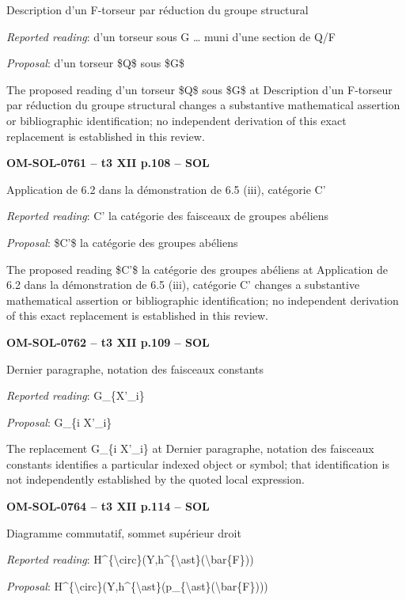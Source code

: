 Description d'un F-torseur par réduction du groupe structural\par
\emph{Reported reading}: d'un torseur sous G … muni d'une section de Q/F\par
\emph{Proposal}: d'un torseur \$Q\$ sous \$G\$\par
The proposed reading d'un torseur \$Q\$ sous \$G\$ at Description d'un F-torseur par réduction du groupe structural changes a substantive mathematical assertion or bibliographic identification; no independent derivation of this exact replacement is established in this review.\par
\par\noindent\textbf{OM-SOL-0761 -- t3 XII p.108 -- SOL}\par
Application de 6.2 dans la démonstration de 6.5 (iii), catégorie C'\par
\emph{Reported reading}: C' la catégorie des faisceaux de groupes abéliens\par
\emph{Proposal}: \$C'\$ la catégorie des groupes abéliens\par
The proposed reading \$C'\$ la catégorie des groupes abéliens at Application de 6.2 dans la démonstration de 6.5 (iii), catégorie C' changes a substantive mathematical assertion or bibliographic identification; no independent derivation of this exact replacement is established in this review.\par
\par\noindent\textbf{OM-SOL-0762 -- t3 XII p.109 -- SOL}\par
Dernier paragraphe, notation des faisceaux constants\par
\emph{Reported reading}: G\_\{X'\_i\}\par
\emph{Proposal}: G\_\{i X'\_i\}\par
The replacement G\_\{i X'\_i\} at Dernier paragraphe, notation des faisceaux constants identifies a particular indexed object or symbol; that identification is not independently established by the quoted local expression.\par
\par\noindent\textbf{OM-SOL-0764 -- t3 XII p.114 -- SOL}\par
Diagramme commutatif, sommet supérieur droit\par
\emph{Reported reading}: H\textasciicircum{}\{\textbackslash{}circ\}(Y,h\textasciicircum{}\{\textbackslash{}ast\}(\textbackslash{}bar\{F\}))\par
\emph{Proposal}: H\textasciicircum{}\{\textbackslash{}circ\}(Y,h\textasciicircum{}\{\textbackslash{}ast\}(p\_\{\textbackslash{}ast\}(\textbackslash{}bar\{F\})))\par
